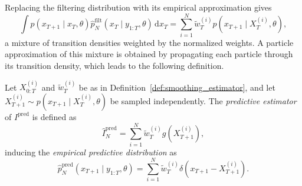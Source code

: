Replacing the filtering distribution with its empirical approximation gives
\begin{equation}
    \int p(x_{T+1} \mid x_T, \theta) \hat{p}_N^{\mathrm{filt}}(x_T \mid y_{1:T}, \theta)\,\mathrm{d}x_T = \sum_{i=1}^N \tilde{w}_T^{(i)} p(x_{T+1} \mid X_T^{(i)}, \theta),
\end{equation}
a mixture of transition densities weighted by the normalized weights. A particle approximation of this mixture is obtained by propagating each particle through its transition density, which leads to the following definition.

\begin{definition}
    Let $X_{0:T}^{(i)}$ and $\tilde{w}_T^{(i)}$ be as in Definition~\ref{def:smoothing_estimator}, and let $X_{T+1}^{(i)} \sim p(x_{T+1} \mid X_T^{(i)}, \theta)$ be sampled independently. 
    The \emph{predictive estimator} of $I^{\mathrm{pred}}$ is defined as
    \begin{equation}
        \hat{I}_N^{\mathrm{pred}} = \sum_{i=1}^{N}\tilde{w}_{T}^{(i)} g(X_{T+1}^{(i)}),
        \label{eq:predictive_estimator}
    \end{equation}
    inducing the \emph{empirical predictive distribution} as
    \begin{equation}
        \hat{p}_N^{\mathrm{pred}}(x_{T+1} \mid y_{1:T}, \theta) = \sum_{i=1}^N \tilde{w}_T^{(i)} \delta(x_{T+1}-X_{T+1}^{(i)}).
        \label{eq:empirical_predictive_distribution}
    \end{equation}
\end{definition}

